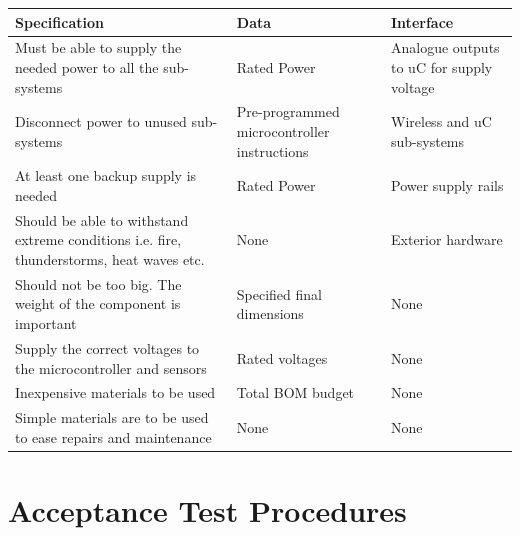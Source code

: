\documentclass[12pt]{article}
\begin{document}
\begin{center}
  \begin{table}[!htb]
    
    \hskip-2.2cm\begin{tabular}{|p{10cm}|p{4cm}|p{4cm}|}
        \hline
        \textbf{Specification} & \textbf{Data} & \textbf{Interface} \\
        \hline
        Must be able to supply the needed power to all the sub-systems & Rated Power & Analogue outputs to uC for supply voltage \\[0.3cm]
        Disconnect power to unused sub-systems & Pre-programmed microcontroller instructions & Wireless and uC sub-systems\\[0.3cm]
        At least one backup supply is needed & Rated Power & Power supply rails\\[0.3cm]
        Should be able to withstand extreme conditions i.e. fire, thunderstorms, heat waves etc. & None & Exterior hardware\\[0.3cm]
        Should not be too big. The weight of the component is important & Specified final dimensions & None\\[0.3cm]
        Supply the correct voltages to the microcontroller and sensors & Rated voltages & None\\[0.3cm]
        Inexpensive materials to be used & Total BOM budget & None\\[0.3cm]
        Simple materials are to be used to ease repairs and maintenance & None & None \\[0.3cm]

        \hline

    \end{tabular}    
    
    \label{tab:summary_measurments}
   \end{table}
\end{center}

\newpage
\section{Acceptance Test Procedures}
\end{document}
